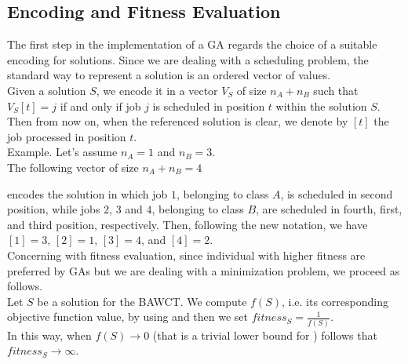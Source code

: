 \documentclass[opre,nonblindrev]{informs3} %
\begin{document}
\subsection{Encoding and Fitness Evaluation}
The first step in the implementation of a GA regards the choice of a suitable encoding for solutions. Since we are dealing with a scheduling problem, the standard way to represent a solution is an ordered vector of values.\\
Given a solution $S$, we encode it in a vector $V_S$ of size $n_A+n_B$ such that $V_S[t] = j$ if and only if job $j$ is scheduled in position $t$ within the solution $S$. Then from now on, when the referenced solution is clear, we denote by $[t]$ the job processed in position $t$.\\
Example.
Let's assume $n_A = 1$ and $n_B=3$.\\
The following vector of size $n_A+n_B=4$
\begin{center}
\end{center}
 encodes the solution in which job $1$, belonging to class $A$, is scheduled in second position, while jobs $2$, $3$ and $4$, belonging to class $B$, are scheduled in fourth, first, and third position, respectively. Then, following the new notation, we have $[1]=3$, $[2]=1$, $[3]=4$, and $[4]=2$.\\
 Concerning with fitness evaluation, since individual with higher fitness are preferred by GAs but we are dealing with a minimization problem, we proceed as follows.\\Let $S$ be a solution for the BAWCT. We compute $f(S)$, i.e. its corresponding objective function value, by using  and then we set $fitness_S = \frac{1}{f(S)}$.\\ In this way, when $f(S) \rightarrow 0 $ (that is a trivial lower bound for ) follows that $fitness_S \rightarrow \infty$.
\end{document}
